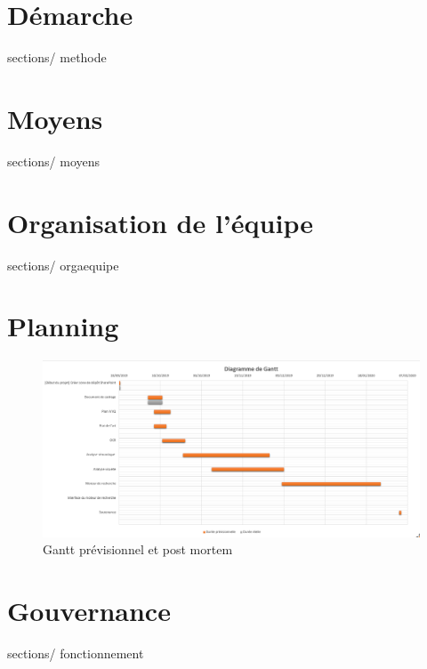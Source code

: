 \documentclass[french, 11pt, a4paper]{article}
\begin{document}
\section {Démarche}
 {sections/} {methode}

\section {Moyens}
 {sections/} {moyens}

\section {Organisation de l'équipe}
 {sections/} {orgaequipe}

\section {Planning}
\begin{figure}[h!]
	\includegraphics[width=\linewidth]{images/gantt.png}
	\caption{Gantt prévisionnel et post mortem}
	\label{fig:MC}
\end{figure}		

\section {Gouvernance}
 {sections/} {fonctionnement}

\newpage
\end{document}
